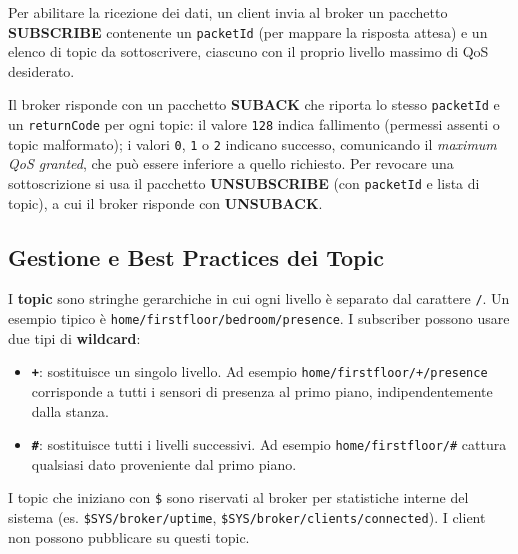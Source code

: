 \documentclass[
  italian,
  openany]{book}
\providecommand{\tightlist}{%
  \setlength{\itemsep}{0pt}\setlength{\parskip}{0pt}}
\begin{document}
Per abilitare la ricezione dei dati, un client invia al broker un
pacchetto \textbf{SUBSCRIBE} contenente un \texttt{packetId} (per
mappare la risposta attesa) e un elenco di topic da sottoscrivere,
ciascuno con il proprio livello massimo di QoS desiderato.

Il broker risponde con un pacchetto \textbf{SUBACK} che riporta lo
stesso \texttt{packetId} e un \texttt{returnCode} per ogni topic: il
valore \texttt{128} indica fallimento (permessi assenti o topic
malformato); i valori \texttt{0}, \texttt{1} o \texttt{2} indicano
successo, comunicando il \emph{maximum QoS granted}, che può essere
inferiore a quello richiesto. Per revocare una sottoscrizione si usa il
pacchetto \textbf{UNSUBSCRIBE} (con \texttt{packetId} e lista di topic),
a cui il broker risponde con \textbf{UNSUBACK}.

\subsection{Gestione e Best Practices dei
Topic}\label{gestione-e-best-practices-dei-topic}

I \textbf{topic} sono stringhe gerarchiche in cui ogni livello è
separato dal carattere \texttt{/}. Un esempio tipico è
\texttt{home/firstfloor/bedroom/presence}. I subscriber possono usare
due tipi di \textbf{wildcard}:

\begin{itemize}
\tightlist
\item
  \textbf{\texttt{+}}: sostituisce un singolo livello. Ad esempio
  \texttt{home/firstfloor/+/presence} corrisponde a tutti i sensori di
  presenza al primo piano, indipendentemente dalla stanza.
\item
  \textbf{\texttt{\#}}: sostituisce tutti i livelli successivi. Ad
  esempio \texttt{home/firstfloor/\#} cattura qualsiasi dato proveniente
  dal primo piano.
\end{itemize}

I topic che iniziano con \texttt{\$} sono riservati al broker per
statistiche interne del sistema (es. \texttt{\$SYS/broker/uptime},
\texttt{\$SYS/broker/clients/connected}). I client non possono
pubblicare su questi topic.
\end{document}
